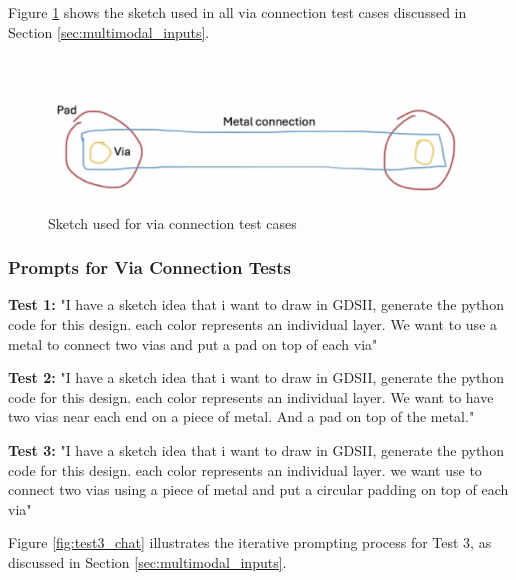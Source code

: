 \documentclass{article}
\begin{document}
Figure \ref{fig:sketch} shows the sketch used in all via connection test cases discussed in Section \ref{sec:multimodal_inputs}.

\begin{figure}[h]
\centering
\includegraphics[width=0.5\linewidth]{sketch.png}
\caption{Sketch used for via connection test cases}
\label{fig:sketch}
\end{figure}

\subsubsection{Prompts for Via Connection Tests}
\label{appendix:via_prompts}

\textbf{Test 1:} "I have a sketch idea that i want to draw in GDSII, generate the python code for this design. each color represents an individual layer. We want to use a metal to connect two vias and put a pad on top of each via"

\textbf{Test 2:} "I have a sketch idea that i want to draw in GDSII, generate the python code for this design. each color represents an individual layer. We want to have two vias near each end on a piece of metal. And a pad on top of the metal."

\textbf{Test 3:} "I have a sketch idea that i want to draw in GDSII, generate the python code for this design. each color represents an individual layer. we want use to connect two vias using a piece of metal and put a circular padding on top of each via"

Figure \ref{fig:test3_chat} illustrates the iterative prompting process for Test 3, as discussed in Section \ref{sec:multimodal_inputs}.
\end{document}
